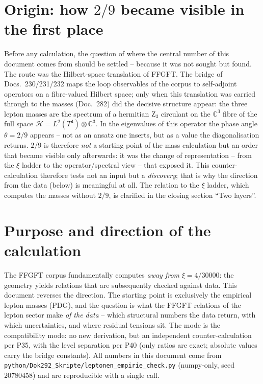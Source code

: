 \section{Origin: how $2/9$ became visible in the first place}
Before any calculation, the question of where the central number of this
document comes from should be settled -- because it was not sought but found.
The route was the Hilbert-space translation of FFGFT. The bridge of
Docs.~230/231/232 maps the loop observables of the corpus to self-adjoint
operators on a fibre-valued Hilbert space; only when this translation was
carried through to the masses (Doc.~282) did the decisive structure appear:
the three lepton masses are the spectrum of a hermitian Z$_3$ circulant on
the $\mathbb{C}^3$ fibre of the full space
$\mathcal{H}=L^2(T^4)\otimes\mathbb{C}^3$. In the eigenvalues of this
operator the phase angle $\theta=2/9$ appears -- not as an ansatz one
inserts, but as a value the diagonalisation returns. $2/9$ is therefore
\emph{not} a starting point of the mass calculation but an order that became
visible only afterwards: it was the change of representation -- from the
$\xi$ ladder to the operator/spectral view -- that exposed it. This
counter-calculation therefore tests not an input but a \emph{discovery};
that is why the direction from the data (below) is meaningful at all. The
relation to the $\xi$ ladder, which computes the masses without $2/9$, is
clarified in the closing section \enquote{Two layers}.

\section{Purpose and direction of the calculation}
The FFGFT corpus fundamentally computes \emph{away from} $\xi=4/30000$: the
geometry yields relations that are subsequently checked against data. This
document reverses the direction. The starting point is exclusively the
empirical lepton masses (PDG), and the question is what the FFGFT relations
of the lepton sector make \emph{of the data} -- which structural numbers the
data return, with which uncertainties, and where residual tensions sit. The
mode is the compatibility mode: no new derivation, but an independent
counter-calculation per P35, with the level separation per P40 (only ratios
are exact; absolute values carry the bridge constants). All numbers in this
document come from \texttt{python/Dok292\_Skripte/leptonen\_empirie\_check.py}
(numpy-only, seed 20780458) and are reproducible with a single call.

